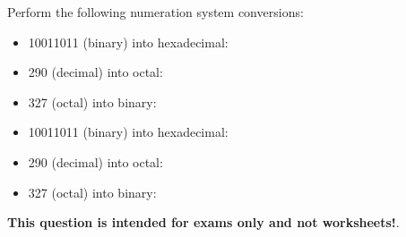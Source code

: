 

Perform the following numeration system conversions:

\begin{itemize}
\item{} 10011011 (binary) into hexadecimal: \underbar{\hskip 50pt}
\vskip 10pt
\item{} 290 (decimal) into octal: \underbar{\hskip 50pt}
\vskip 10pt
\item{} 327 (octal) into binary: \underbar{\hskip 50pt}
\end{itemize}







\begin{itemize}
\item{} 10011011 (binary) into hexadecimal: 
\vskip 10pt
\item{} 290 (decimal) into octal: 
\vskip 10pt
\item{} 327 (octal) into binary: 
\end{itemize}







{\bf This question is intended for exams only and not worksheets!}.




